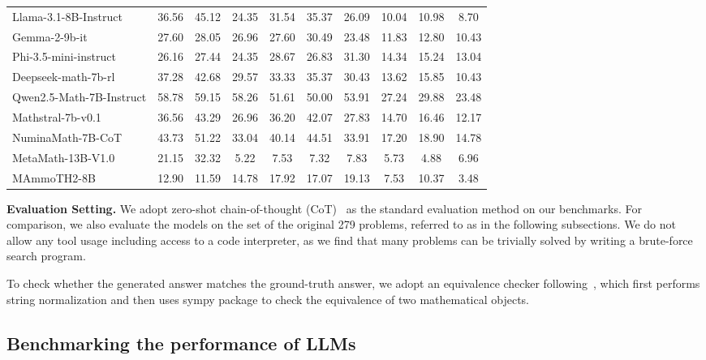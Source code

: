 \begin{table*}[htbp]
{\begin{tabular}{l>{\columncolor{gray!10}}ccc>{\columncolor{gray!10}}ccc>{\columncolor{gray!10}}ccc}
    \midrule
    Llama-3.1-8B-Instruct &   36.56 & 45.12 & 24.35  &   31.54 & 35.37 & 26.09  &   10.04 & 10.98 & 8.70  \\ 
    Gemma-2-9b-it &   27.60 & 28.05 & 26.96  &   27.60 & 30.49 & 23.48  &   11.83 & 12.80 & 10.43  \\ 
    Phi-3.5-mini-instruct &   26.16 & 27.44 & 24.35  &   28.67 & 26.83 & 31.30  &   14.34 & 15.24 & 13.04  \\ 
    \midrule
    Deepseek-math-7b-rl &   37.28 & 42.68 & 29.57  &   33.33 & 35.37 & 30.43  &   13.62 & 15.85 & 10.43  \\ 
    Qwen2.5-Math-7B-Instruct &   58.78 & 59.15 & 58.26  &   51.61 & 50.00 & 53.91  &   27.24 & 29.88 & 23.48  \\ 
    Mathstral-7b-v0.1 &   36.56 & 43.29 & 26.96  &   36.20 & 42.07 & 27.83  &   14.70 & 16.46 & 12.17  \\ 
    NuminaMath-7B-CoT &   43.73 & 51.22 & 33.04  &   40.14 & 44.51 & 33.91  &   17.20 & 18.90 & 14.78  \\ 
    MetaMath-13B-V1.0 &   21.15 & 32.32 & 5.22  &   7.53 & 7.32 & 7.83  &   5.73 & 4.88 & 6.96  \\ 
    MAmmoTH2-8B &   12.90 & 11.59 & 14.78  &   17.92 & 17.07 & 19.13  &   7.53 & 10.37 & 3.48  \\ 
    \bottomrule
    \end{tabular}
    }
    
    \label{tab:main}
    \end{table*}


\textbf{Evaluation Setting.} We adopt zero-shot chain-of-thought (CoT)~\citep{wei2022chain, kojima2022large} as the standard evaluation method on our benchmarks. For comparison, we also evaluate the  models on the set of the original 279 problems, referred to as \Original in the following subsections. We do not allow any tool usage including access to a code interpreter, as we find that many problems can be trivially solved by writing a brute-force search program. 

To check whether the generated answer matches the ground-truth answer, we adopt an equivalence checker following~\citet{hendrycksmath2021, shao2024deepseekmath}, which first performs string normalization and then uses sympy package to check the equivalence of two mathematical objects. 




\subsection{Benchmarking the performance of LLMs}
\label{sec:benchmarking}







